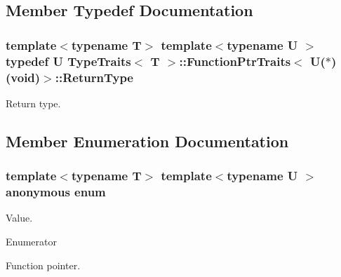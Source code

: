 \subsection{Member Typedef Documentation}
\subsubsection[{\texorpdfstring{Return\+Type}{ReturnType}}]{\setlength{\rightskip}{0pt plus 5cm}template$<$typename T$>$ template$<$typename U $>$ typedef U {\bf Type\+Traits}$<$ T $>$\+::{\bf Function\+Ptr\+Traits}$<$ U($\ast$)(void)$>$\+::{\bf Return\+Type}}\hypertarget{structTypeTraits_1_1FunctionPtrTraits_3_01U_07_5_08_07void_08_4_afa8114a12b207631358cef7f97c33307}{}\label{structTypeTraits_1_1FunctionPtrTraits_3_01U_07_5_08_07void_08_4_afa8114a12b207631358cef7f97c33307}
Return type. 

\subsection{Member Enumeration Documentation}
\subsubsection[{\texorpdfstring{anonymous enum}{anonymous enum}}]{\setlength{\rightskip}{0pt plus 5cm}template$<$typename T$>$ template$<$typename U $>$ anonymous enum}\hypertarget{structTypeTraits_1_1FunctionPtrTraits_3_01U_07_5_08_07void_08_4_a76d1f20c010aa03d3aaf029f7714b619}{}\label{structTypeTraits_1_1FunctionPtrTraits_3_01U_07_5_08_07void_08_4_a76d1f20c010aa03d3aaf029f7714b619}
Value. \begin{Desc}
\item[Enumerator]\par
\begin{description}
\item[{\em 
Is\+Function\+Pointer\hypertarget{structTypeTraits_1_1FunctionPtrTraits_3_01U_07_5_08_07void_08_4_a76d1f20c010aa03d3aaf029f7714b619ad0beb864e50ea35770e107c61f1ca453}{}\label{structTypeTraits_1_1FunctionPtrTraits_3_01U_07_5_08_07void_08_4_a76d1f20c010aa03d3aaf029f7714b619ad0beb864e50ea35770e107c61f1ca453}
}]Function pointer. \end{description}
\end{Desc}


